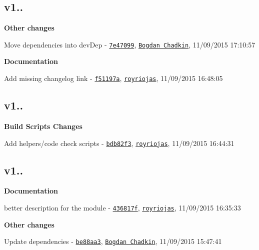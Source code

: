 \subsection*{v1..}


\begin{DoxyItemize}
\item {\bfseries Other changes}
\begin{DoxyItemize}
\item Move dependencies into dev\+Dep -\/ \href{https://github.com/royriojas/flat-cache/commit/7e47099}{\tt 7e47099}, \href{https://github.com/Bogdan Chadkin}{\tt Bogdan Chadkin}, 11/09/2015 17\+:10\+:57
\end{DoxyItemize}
\item {\bfseries Documentation}
\begin{DoxyItemize}
\item Add missing changelog link -\/ \href{https://github.com/royriojas/flat-cache/commit/f51197a}{\tt f51197a}, \href{https://github.com/royriojas}{\tt royriojas}, 11/09/2015 16\+:48\+:05
\end{DoxyItemize}
\end{DoxyItemize}

\subsection*{v1..}


\begin{DoxyItemize}
\item {\bfseries Build Scripts Changes}
\begin{DoxyItemize}
\item Add helpers/code check scripts -\/ \href{https://github.com/royriojas/flat-cache/commit/bdb82f3}{\tt bdb82f3}, \href{https://github.com/royriojas}{\tt royriojas}, 11/09/2015 16\+:44\+:31
\end{DoxyItemize}
\end{DoxyItemize}

\subsection*{v1..}


\begin{DoxyItemize}
\item {\bfseries Documentation}
\begin{DoxyItemize}
\item better description for the module -\/ \href{https://github.com/royriojas/flat-cache/commit/436817f}{\tt 436817f}, \href{https://github.com/royriojas}{\tt royriojas}, 11/09/2015 16\+:35\+:33
\end{DoxyItemize}
\item {\bfseries Other changes}
\begin{DoxyItemize}
\item Update dependencies -\/ \href{https://github.com/royriojas/flat-cache/commit/be88aa3}{\tt be88aa3}, \href{https://github.com/Bogdan Chadkin}{\tt Bogdan Chadkin}, 11/09/2015 15\+:47\+:41
\end{DoxyItemize}
\end{DoxyItemize}

